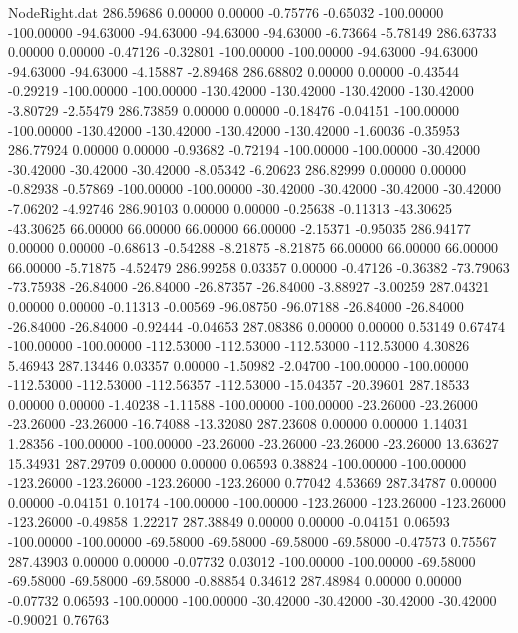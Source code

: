 \begin{filecontents}{NodeRight.dat}
 286.59686    0.00000    0.00000    -0.75776   -0.65032 -100.00000 -100.00000  -94.63000  -94.63000  -94.63000  -94.63000   -6.73664   -5.78149
 286.63733    0.00000    0.00000    -0.47126   -0.32801 -100.00000 -100.00000  -94.63000  -94.63000  -94.63000  -94.63000   -4.15887   -2.89468
 286.68802    0.00000    0.00000    -0.43544   -0.29219 -100.00000 -100.00000 -130.42000 -130.42000 -130.42000 -130.42000   -3.80729   -2.55479
 286.73859    0.00000    0.00000    -0.18476   -0.04151 -100.00000 -100.00000 -130.42000 -130.42000 -130.42000 -130.42000   -1.60036   -0.35953
 286.77924    0.00000    0.00000    -0.93682   -0.72194 -100.00000 -100.00000  -30.42000  -30.42000  -30.42000  -30.42000   -8.05342   -6.20623
 286.82999    0.00000    0.00000    -0.82938   -0.57869 -100.00000 -100.00000  -30.42000  -30.42000  -30.42000  -30.42000   -7.06202   -4.92746
 286.90103    0.00000    0.00000    -0.25638   -0.11313  -43.30625  -43.30625   66.00000   66.00000   66.00000   66.00000   -2.15371   -0.95035
 286.94177    0.00000    0.00000    -0.68613   -0.54288   -8.21875   -8.21875   66.00000   66.00000   66.00000   66.00000   -5.71875   -4.52479
 286.99258    0.03357    0.00000    -0.47126   -0.36382  -73.79063  -73.75938  -26.84000  -26.84000  -26.87357  -26.84000   -3.88927   -3.00259
 287.04321    0.00000    0.00000    -0.11313   -0.00569  -96.08750  -96.07188  -26.84000  -26.84000  -26.84000  -26.84000   -0.92444   -0.04653
 287.08386    0.00000    0.00000     0.53149    0.67474 -100.00000 -100.00000 -112.53000 -112.53000 -112.53000 -112.53000    4.30826    5.46943
 287.13446    0.03357    0.00000    -1.50982   -2.04700 -100.00000 -100.00000 -112.53000 -112.53000 -112.56357 -112.53000  -15.04357  -20.39601
 287.18533    0.00000    0.00000    -1.40238   -1.11588 -100.00000 -100.00000  -23.26000  -23.26000  -23.26000  -23.26000  -16.74088  -13.32080
 287.23608    0.00000    0.00000     1.14031    1.28356 -100.00000 -100.00000  -23.26000  -23.26000  -23.26000  -23.26000   13.63627   15.34931
 287.29709    0.00000    0.00000     0.06593    0.38824 -100.00000 -100.00000 -123.26000 -123.26000 -123.26000 -123.26000    0.77042    4.53669
 287.34787    0.00000    0.00000    -0.04151    0.10174 -100.00000 -100.00000 -123.26000 -123.26000 -123.26000 -123.26000   -0.49858    1.22217
 287.38849    0.00000    0.00000    -0.04151    0.06593 -100.00000 -100.00000  -69.58000  -69.58000  -69.58000  -69.58000   -0.47573    0.75567
 287.43903    0.00000    0.00000    -0.07732    0.03012 -100.00000 -100.00000  -69.58000  -69.58000  -69.58000  -69.58000   -0.88854    0.34612
 287.48984    0.00000    0.00000    -0.07732    0.06593 -100.00000 -100.00000  -30.42000  -30.42000  -30.42000  -30.42000   -0.90021    0.76763

\end{filecontents}
